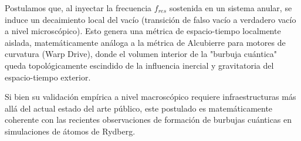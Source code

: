 \documentclass[12pt,a4paper]{article}
\begin{document}
Postulamos que, al inyectar la frecuencia $f_{res}$ sostenida en un sistema anular, se induce un decaimiento local del vacío (transición de falso vacío a verdadero vacío a nivel microscópico). Esto genera una métrica de espacio-tiempo localmente aislada, matemáticamente análoga a la métrica de Alcubierre para motores de curvatura (Warp Drive), donde el volumen interior de la "burbuja cuántica" queda topológicamente escindido de la influencia inercial y gravitatoria del espacio-tiempo exterior. 

Si bien su validación empírica a nivel macroscópico requiere infraestructuras más allá del actual estado del arte público, este postulado es matemáticamente coherente con las recientes observaciones de formación de burbujas cuánticas en simulaciones de átomos de Rydberg.
\end{document}
